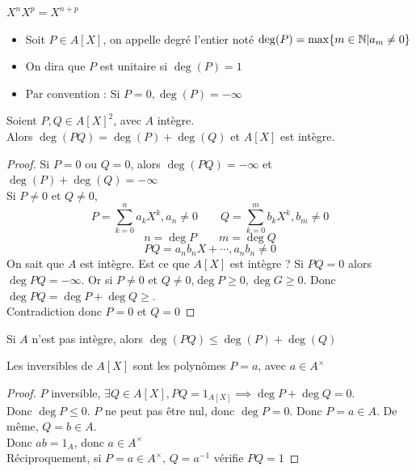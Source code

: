 \documentclass[]{report}
\begin{document}
    \begin{prop}{}{}
        $X^nX^p=X^{n+p}$
    \end{prop}

    \begin{df}{}{}
        \begin{itemize}
            \item Soit $P\in A[X]$, on appelle degré l'entier noté $\deg(P)=\max\{ m\in\mathbb{N}|a_m\neq0\}$
            \item On dira que $P$ est unitaire si $\deg(P)=1$
            \item Par convention : Si $P=0, \deg(P)=-\infty$
        \end{itemize}
    \end{df}

    \begin{prop}{}{}
        Soient $P,Q\in A[X]^2$, avec $A$ intègre.\\
        Alors $\deg(PQ)=\deg(P)+\deg(Q)$ et $A[X]$ est intègre.
    \end{prop}

    \begin{proof}
        Si $P=0$ ou $Q=0$, alors $\deg (PQ)=-\infty$ et $\deg(P)+\deg (Q)=-\infty$\\
        Si $P\neq 0$ et $Q\neq 0$,
        \[P=\sum_{k=0}^n a_k X^k,a_n\neq 0\qquad Q=\sum_{k=0}^m b_k X^k,b_m\neq 0\]
        \[n=\deg P\qquad m=\deg Q\]
        \[PQ=a_n b_n X+\cdots, a_n b_n\neq 0\]
        On sait que $A$ est intègre. Est ce que $A[X]$ est intègre ? Si $PQ=0$ alors $\deg PQ=-\infty$. Or si $P\neq 0$ et $Q\neq 0$,$\deg P\ge 0,\deg G\ge 0$. Donc $\deg PQ=\deg P +\deg Q \ge$.\\
        Contradiction donc $P=0$ et $Q=0$
    \end{proof}

    \begin{re}{}{}
        Si $A$ n'est pas intègre, alors $\deg(PQ)\le\deg(P)+\deg(Q)$
    \end{re}

    \begin{prop}{}{}
        Les inversibles de $A[X]$ sont les polynômes $P=a$, avec $a\in A^\times$
    \end{prop}

    \begin{proof}
        $P$ inversible, $\exists Q\in A[X],PQ=1_{A[X]}\implies \deg P+\deg Q=0$.\\
        Donc $\deg P\le 0$. $P $ ne peut pas être nul, donc $\deg P=0$. Donc $P=a\in A$. De même, $Q=b\in A$.\\
        Donc $ab=1_{A}$, donc $a\in A^\times$\\
        Réciproquement, si $P=a\in A^{\times}$, $Q=a^{-1}$ vérifie $PQ=1$
    \end{proof}
\end{document}
